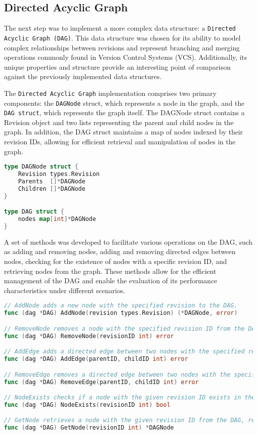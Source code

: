 \subsection{Directed Acyclic Graph}
The next step was to implement a more complex data structure: a \lstinline{Directed Acyclic Graph (DAG)}. This data structure was chosen for its ability to model complex relationships between revisions and represent branching and merging operations commonly found in Version Control Systems (VCS). Additionally, its unique properties and structure provide an interesting point of comparison against the previously implemented data structures.
\smallskip

The \lstinline{Directed Acyclic Graph} implementation comprises two primary components: the \lstinline{DAGNode} struct, which represents a node in the graph, and the \lstinline{DAG struct}, which represents the graph itself. The DAGNode struct contains a Revision object and two lists representing the parent and child nodes in the graph. In addition, the DAG struct maintains a map of nodes indexed by their revision IDs, allowing for efficient retrieval and manipulation of nodes in the graph.

\begin{lstlisting}[language=go]
type DAGNode struct {
	Revision types.Revision
	Parents  []*DAGNode
	Children []*DAGNode
}

type DAG struct {
	nodes map[int]*DAGNode
}
\end{lstlisting}
\medskip

A set of methods was developed to facilitate various operations on the DAG, such as adding and removing nodes, adding and removing directed edges between nodes, checking for the existence of nodes with a specific revision ID, and retrieving nodes from the graph. These methods allow for the efficient management of the DAG and enable the evaluation of its performance characteristics under different scenarios.

\begin{lstlisting}[language=go]
// AddNode adds a new node with the specified revision to the DAG.
func (dag *DAG) AddNode(revision types.Revision) (*DAGNode, error)

// RemoveNode removes a node with the specified revision ID from the DAG.
func (dag *DAG) RemoveNode(revisionID int) error

// AddEdge adds a directed edge between two nodes with the specified revision IDs in the DAG.
func (dag *DAG) AddEdge(parentID, childID int) error

// RemoveEdge removes a directed edge between two nodes with the specified revision IDs in the DAG.
func (dag *DAG) RemoveEdge(parentID, childID int) error

// NodeExists checks if a node with the given revision ID exists in the DAG.
func (dag *DAG) NodeExists(revisionID int) bool

// GetNode retrieves a node with the given revision ID from the DAG, returning nil if it doesn't exist.
func (dag *DAG) GetNode(revisionID int) *DAGNode
\end{lstlisting}

